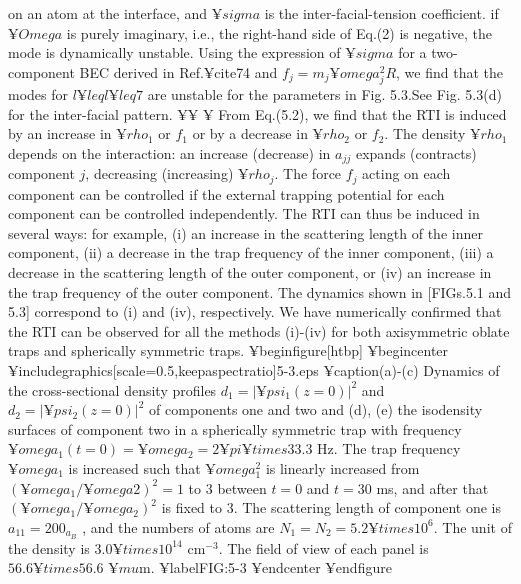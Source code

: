 {{{{{on an atom at the interface, and $¥sigma$ is the inter-facial-tension
coefficient. if $¥Omega$ is purely imaginary, i.e., the right-hand side of
Eq.(2) is negative, the mode is dynamically unstable. Using the
expression of $¥sigma$ for a two-component BEC derived in Ref.¥cite{74}
and $f_j = m_j ¥omega_j^2 R$, we find that the modes for $l ¥leq l ¥leq 7$ are
unstable for the parameters in Fig. 5.3.See Fig. 5.3(d) for the inter-facial pattern.
¥¥
¥ From Eq.(5.2), we find that the RTI is induced by an
increase in $¥rho_1$ or $f_1$ or by a decrease in $¥rho_2$ or $f_2$. The density
$¥rho_1$ depends on the interaction: an increase (decrease) in $a_{jj}$
expands (contracts) component $j$, decreasing (increasing) $¥rho_{j}$.
The force $f_j$ acting on each component can be controlled if
the external trapping potential for each component can be
controlled independently. The RTI can thus be induced in
several ways: for example, (i) an increase in the scattering
length of the inner component, (ii) a decrease in the trap
frequency of the inner component, (iii) a decrease in the
scattering length of the outer component, or (iv) an increase
in the trap frequency of the outer component. The dynamics
shown in [FIGs.5.1 and 5.3] correspond to (i) and (iv), respectively.
We have numerically confirmed that the RTI can be observed
for all the methods (i)-(iv) for both axisymmetric oblate traps
and spherically symmetric traps.
¥begin{figure}[htbp]
¥begin{center}
¥includegraphics[scale=0.5,keepaspectratio]{5-3.eps}
¥caption{(a)-(c) Dynamics of the cross-sectional
density profiles $d_1 = | ¥psi_1 (z=0) |^2$ and $d_2 = | ¥psi_2 (z=0) |^2$ of components
one and two and (d), (e) the isodensity surfaces of component
two in a spherically symmetric trap with frequency $¥omega_1(t=0)= ¥omega_2 = 2 ¥pi ¥times 33.3 $ Hz.
The trap frequency $¥omega_1$ is increased such that $¥omega_1^2$
is linearly increased from $(¥omega_1 / ¥omega2)^2 = 1$ to $3$ between $t=0$ and
$t=30$ ms, and after that $(¥omega_1/¥omega_2)^2$ is fixed to $3$. The scattering length
of component one is $a_{11} = 200_{a_B}$ , and the numbers of atoms are
$N_1 = N_2 = 5.2 ¥times 10^6$. The unit of the density is $3.0 ¥times 10^{14}$ cm$^{-3}$.
The field of view of each panel is $56.6 ¥times 56.6$ $¥mu$m.}
¥label{FIG:5-3}
¥end{center}
¥end{figure}

}}}}}
